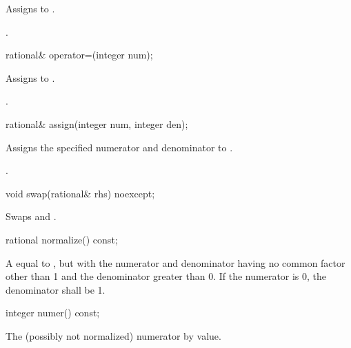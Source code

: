\begin{itemdescr}
\effects Assigns  to .

\returns {}.
\end{itemdescr}

\begin{itemdecl}
rational& operator=(integer num);
\end{itemdecl}

\begin{itemdescr}
\effects Assigns  to .

\returns {}.
\end{itemdescr}

\begin{itemdecl}
rational& assign(integer num, integer den);
\end{itemdecl}

\begin{itemdescr}
\requires {}

\effects Assigns the specified numerator and denominator to .

\returns {}.
\end{itemdescr}

\begin{itemdecl}
void swap(rational& rhs) noexcept;
\end{itemdecl}

\begin{itemdescr}
\effects Swaps  and .
\end{itemdescr}

\begin{itemdecl}
rational normalize() const;
\end{itemdecl}

\begin{itemdescr}
\returns A  equal to , but with the numerator and denominator having no common factor other than 1 and the denominator greater than 0. If the numerator is 0, the denominator shall be 1.
\end{itemdescr}

\begin{itemdecl}
integer numer() const;
\end{itemdecl}

\begin{itemdescr}
\returns The (possibly not normalized) numerator by value.
\end{itemdescr}

